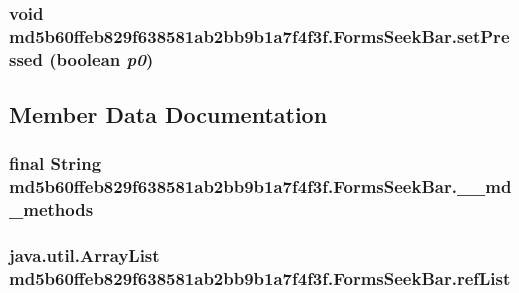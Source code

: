 \hypertarget{classmd5b60ffeb829f638581ab2bb9b1a7f4f3f_1_1_forms_seek_bar_3e8785634191b0032360570d26a6cd8a}{
\subsubsection[{setPressed}]{\setlength{\rightskip}{0pt plus 5cm}void md5b60ffeb829f638581ab2bb9b1a7f4f3f.FormsSeekBar.setPressed (boolean {\em p0})}}
\label{classmd5b60ffeb829f638581ab2bb9b1a7f4f3f_1_1_forms_seek_bar_3e8785634191b0032360570d26a6cd8a}




\subsection{Member Data Documentation}
\hypertarget{classmd5b60ffeb829f638581ab2bb9b1a7f4f3f_1_1_forms_seek_bar_7c8d57a3b8d9e0664dc0d6410af2b631}{
\subsubsection[{\_\-\_\-md\_\-methods}]{\setlength{\rightskip}{0pt plus 5cm}final String {\bf md5b60ffeb829f638581ab2bb9b1a7f4f3f.FormsSeekBar.\_\-\_\-md\_\-methods}}}
\label{classmd5b60ffeb829f638581ab2bb9b1a7f4f3f_1_1_forms_seek_bar_7c8d57a3b8d9e0664dc0d6410af2b631}


\hypertarget{classmd5b60ffeb829f638581ab2bb9b1a7f4f3f_1_1_forms_seek_bar_6ddd1f5719fb4c93d3a92c0d6b9a6694}{
\subsubsection[{refList}]{\setlength{\rightskip}{0pt plus 5cm}java.util.ArrayList {\bf md5b60ffeb829f638581ab2bb9b1a7f4f3f.FormsSeekBar.refList}}}
\label{classmd5b60ffeb829f638581ab2bb9b1a7f4f3f_1_1_forms_seek_bar_6ddd1f5719fb4c93d3a92c0d6b9a6694}




